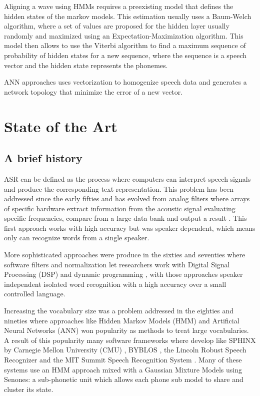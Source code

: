Aligning a wave using HMMs requires a preexisting model that defines the hidden states of the markov models. This estimation usually uses a Baum-Welch algorithm, where a set of values are proposed for the hidden layer usually randomly and maximized using an Expectation-Maximization algorithm. This model then allows to use the Viterbi algorithm to find a maximum sequence of probability of hidden states for a new sequence, where the sequence is a speech vector and the hidden state represents the phonemes.

ANN approaches uses vectorization to homogenize speech data and generates a network topology that minimize the error of a new vector.


\section{State of the Art}

\subsection{A brief history}

ASR can be defined as the process where computers can interpret speech signals and produce the corresponding text representation. This problem has been addressed since the early fifties and has evolved from analog filters where arrays of specific hardware extract information from the acoustic signal evaluating specific frequencies, compare from a large data bank and output a result  \cite{Davis1952AutomaticDigits,Olson1957PhoneticTypewriter}. This first approach works with high accuracy but was speaker dependent, which means only can recognize words from a single speaker. 

More sophisticated approaches were produce in the sixties and seventies where software filters and normalization let researchers work with Digital Signal Processing (DSP) and dynamic programming \cite{Velichko1970AutomaticWords,Sakoe1978DynamicRecognition,Itakura1975MinimumRecognition}, with those approaches speaker independent isolated word recognition with a high accuracy over a small controlled language.

Increasing the vocabulary size was a problem addressed in the eighties and nineties where approaches like Hidden Markov Models (HMM) \cite{RabinerARecognition} and Artificial Neural Networks (ANN) \cite{Waibel1989PhonemeNetworks} won popularity as methods to treat large vocabularies. A result of this popularity many software frameworks where develop like SPHINX by Carnegie Mellon University (CMU) \cite{Lee1990AnSystem}, BYBLOS \cite{ChowBYBLOS:System}, the Lincoln Robust Speech Recognizer \cite{PaulTheRecognizer} and the MIT Summit Speech Recognition System \cite{Zue1989TheReport}. Many of these systems use an HMM approach mixed with a Gaussian Mixture Models using Senones: a sub-phonetic unit which allows each phone sub model to share and cluster its state\cite{Hwang}.


